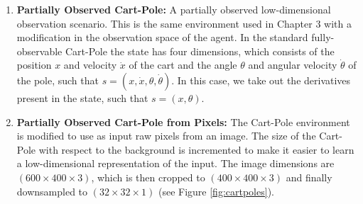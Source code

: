\begin{enumerate}
    \item \textbf{Partially Observed Cart-Pole:} A partially observed low-dimensional observation scenario. This is the same environment used in Chapter 3 with a modification in the observation space of the agent. In the standard fully-observable Cart-Pole the state has four dimensions, which consists of the position $x$ and velocity $\dot x$ of the cart and the angle $\theta$ and angular velocity $\dot \theta$ of the pole, such that $s=(x, \dot x, \theta, \dot \theta)$. In this case, we take out the derivatives present in the state, such that $s=(x, \theta)$.
    
    \item \textbf{Partially Observed Cart-Pole from Pixels:} The Cart-Pole environment is modified to use as input raw pixels from an image. The size of the Cart-Pole with respect to the background is incremented to make it easier to learn a low-dimensional representation of the input. The image dimensions are $(600 \times 400 \times 3)$, which is then cropped to $(400 \times 400 \times 3)$ and finally downsampled to $(32 \times 32 \times 1)$ (see Figure \ref{fig:cartpoles}).
    

\end{enumerate}
